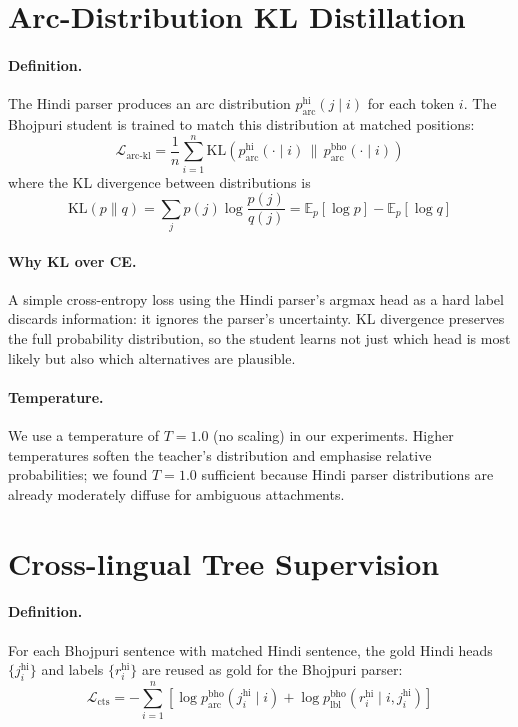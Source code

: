 \documentclass[12pt,a4paper,oneside]{report}
\begin{document}
\section{Arc-Distribution KL Distillation}

\paragraph{Definition.} The Hindi parser produces an arc distribution
$p^{\text{hi}}_{\text{arc}}(j \mid i)$ for each token $i$. The Bhojpuri
student is trained to match this distribution at matched positions:
\begin{equation}
  \mathcal{L}_{\text{arc-kl}} = \frac{1}{n} \sum_{i=1}^{n}
    \mathrm{KL}\!\left(p^{\text{hi}}_{\text{arc}}(\cdot \mid i) \,\Big\|\,
                       p^{\text{bho}}_{\text{arc}}(\cdot \mid i) \right)
\end{equation}
where the KL divergence between distributions is
\begin{equation}
  \mathrm{KL}(p \| q) = \sum_{j} p(j) \log \frac{p(j)}{q(j)}
                       = \mathbb{E}_p[\log p] - \mathbb{E}_p[\log q]
\end{equation}

\paragraph{Why KL over CE.}
A simple cross-entropy loss using the Hindi parser's argmax head as a hard
label discards information: it ignores the parser's uncertainty. KL divergence
preserves the full probability distribution, so the student learns not just
which head is most likely but also which alternatives are plausible.

\paragraph{Temperature.}
We use a temperature of $T = 1.0$ (no scaling) in our experiments. Higher
temperatures soften the teacher's distribution and emphasise relative
probabilities; we found $T = 1.0$ sufficient because Hindi parser
distributions are already moderately diffuse for ambiguous attachments.

\section{Cross-lingual Tree Supervision}

\paragraph{Definition.} For each Bhojpuri sentence with matched Hindi
sentence, the gold Hindi heads $\{j^{\text{hi}}_i\}$ and labels
$\{r^{\text{hi}}_i\}$ are reused as gold for the Bhojpuri parser:
\begin{equation}
  \mathcal{L}_{\text{cts}} = -\sum_{i=1}^{n} \left[
    \log p^{\text{bho}}_{\text{arc}}(j^{\text{hi}}_i \mid i) +
    \log p^{\text{bho}}_{\text{lbl}}(r^{\text{hi}}_i \mid i, j^{\text{hi}}_i)
  \right]
\end{equation}
\end{document}
